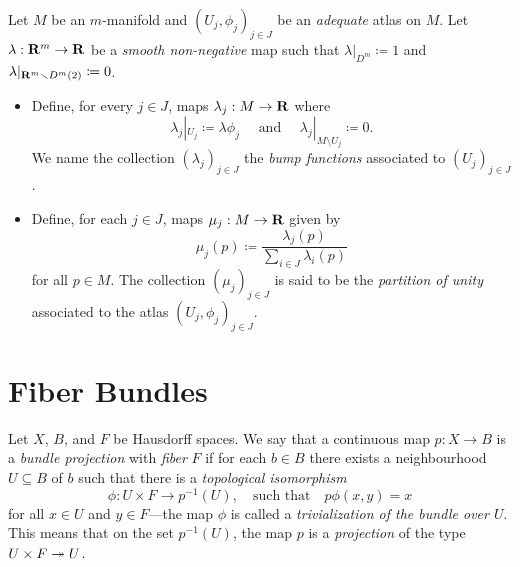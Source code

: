 \begin{definition}
\label{def:}
Let \(M\) be an \(m\)-manifold and \((U_{j}, \phi_j)_{j \in J}\) be an
\emph{adequate} atlas on \(M\). Let \(\lambda: \mathbf{R}^m \to \mathbf{R}\) be a \emph{smooth
  non-negative} map such that \(\lambda|_{D^m} \coloneq 1\) and
\(\lambda|_{\mathbf{R}^m \smallsetminus D^m(2)} \coloneq 0\).
\begin{itemize}\setlength\itemsep{0em}
\item Define, for every \(j \in J\), maps \(\lambda_j: M \to \mathbf{R}\) where
  \[
  \lambda_j|_{U_j} \coloneq \lambda \phi_j
  \quad\text{ and }\quad
  \lambda_j|_{M \setminus U_j} \coloneq 0.
  \]
  We name the collection \((\lambda_j)_{j \in J}\) the \emph{bump functions}
  associated to \((U_j)_{j \in J}\).
\item Define, for each \(j \in J\), maps \(\mu_j: M \to \mathbf{R}\) given by
  \[
  \mu_j(p) \coloneq \frac{\lambda_j(p)}{\sum_{i \in J} \lambda_i(p)}
  \]
  for all \(p \in M\). The collection \((\mu_j)_{j \in J}\) is said to be the
  \emph{partition of unity} associated to the atlas \((U_j, \phi_j)_{j \in J}\).
\end{itemize}
\end{definition}

\section{Fiber Bundles}

\begin{definition}
\label{def:bundle-projection}
Let \(X\), \(B\), and \(F\) be Hausdorff spaces. We say that a continuous map
\(p: X \to B\) is a \emph{bundle projection} with \emph{fiber} \(F\) if for each
\(b \in B\) there exists a neighbourhood \(U \subseteq B\) of \(b\) such that
there is a \emph{topological isomorphism}
\[
\phi: U \times F \longrightarrow p^{-1}(U),
\quad\text{such that}\quad
p \phi(x, y) = x
\]
for all \(x \in U\) and \(y \in F\)---the map \(\phi\) is called a
\emph{trivialization of the bundle over \(U\)}. This means that on the set
\(p^{-1}(U)\), the map \(p\) is a \emph{projection} of the type
\(U \times F \twoheadrightarrow U\).
\end{definition}

